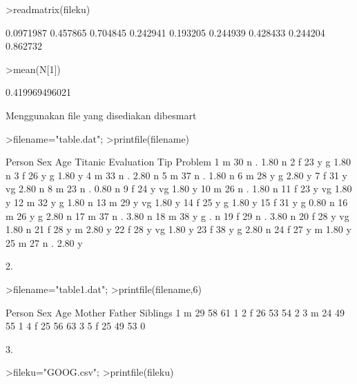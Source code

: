 \documentclass{article}
\begin{document}
\begin{eulernotebook}
\begin{eulercomment}
\begin{eulercomment}
\begin{euleroutput}
\end{euleroutput}
\begin{eulerprompt}
>readmatrix(fileku)
\end{eulerprompt}
\begin{euleroutput}
      0.0971987      0.457865      0.704845 
       0.242941      0.193205      0.244939 
       0.428433      0.244204      0.862732 
\end{euleroutput}
\begin{eulerprompt}
>mean(N[1])
\end{eulerprompt}
\begin{euleroutput}
  0.419969496021
\end{euleroutput}
\begin{eulercomment}
Menggunakan file yang disediakan dibesmart
\end{eulercomment}
\begin{eulerprompt}
>filename="table.dat";
>printfile(filename)
\end{eulerprompt}
\begin{euleroutput}
  Person Sex Age Titanic Evaluation Tip Problem
  1 m 30 n . 1.80 n
  2 f 23 y g 1.80 n
  3 f 26 y g 1.80 y
  4 m 33 n . 2.80 n
  5 m 37 n . 1.80 n
  6 m 28 y g 2.80 y
  7 f 31 y vg 2.80 n
  8 m 23 n . 0.80 n
  9 f 24 y vg 1.80 y
  10 m 26 n . 1.80 n
  11 f 23 y vg 1.80 y
  12 m 32 y g 1.80 n
  13 m 29 y vg 1.80 y
  14 f 25 y g 1.80 y
  15 f 31 y g 0.80 n
  16 m 26 y g 2.80 n
  17 m 37 n . 3.80 n
  18 m 38 y g . n
  19 f 29 n . 3.80 n
  20 f 28 y vg 1.80 n
  21 f 28 y m 2.80 y
  22 f 28 y vg 1.80 y
  23 f 38 y g 2.80 n
  24 f 27 y m 1.80 y
  25 m 27 n . 2.80 y
\end{euleroutput}
\begin{eulercomment}
2. 
\end{eulercomment}
\begin{eulerprompt}
>filename="table1.dat";
>printfile(filename,6)
\end{eulerprompt}
\begin{euleroutput}
  Person Sex Age Mother Father Siblings
  1 m 29 58 61 1
  2 f 26 53 54 2
  3 m 24 49 55 1
  4 f 25 56 63 3
  5 f 25 49 53 0
\end{euleroutput}
\begin{eulercomment}
3.
\end{eulercomment}
\begin{eulerprompt}
>fileku="GOOG.csv";
>printfile(fileku)
\end{eulerprompt}
\begin{euleroutput}

\end{euleroutput}
\end{eulercomment}
\end{eulercomment}
\end{eulernotebook}
\end{document}
